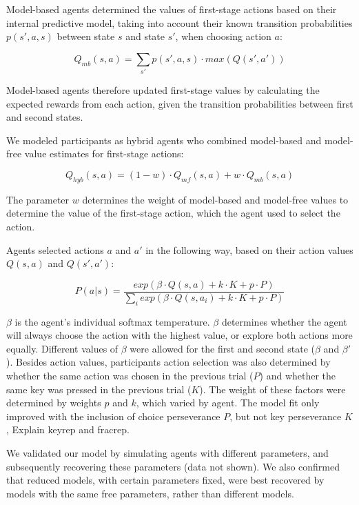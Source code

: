 \documentclass[11pt]{article} %
\begin{document}
Model-based agents determined the values of first-stage actions based on their internal predictive model, taking into account their known transition probabilities $p(s', a, s)$ between state $s$ and state $s'$, when choosing action $a$:

\begin{equation}
Q_{mb}(s, a) = \sum_{s'} p(s', a, s) \cdot max(Q(s', a'))
\end{equation}

Model-based agents therefore updated first-stage values by calculating the expected rewards from each action, given the transition probabilities between first and second states.

We modeled participants as hybrid agents who combined model-based and model-free value estimates for first-stage actions:

\begin{equation}
Q_{hyb}(s, a) = (1 - w) \cdot Q_{mf}(s, a) + w \cdot Q_{mb}(s, a)
\end{equation}

The parameter $w$ determines the weight of model-based and model-free values to determine the value of the first-stage action, which the agent used to select the action.

Agents selected actions $a$ and $a'$ in the following way, based on their action values $Q(s, a)$ and $Q(s', a')$:

\begin{equation}
P(a|s) = \frac{exp(\beta \cdot Q(s, a) + k \cdot K + p \cdot P)}{\sum_{i} exp(\beta \cdot Q(s, a_{i}) + k \cdot K + p \cdot P)}
\end{equation}

$\beta$ is the agent's individual softmax temperature. $\beta$ determines whether the agent will always choose the action with the highest value, or explore both actions more equally. Different values of $\beta$ were allowed for the first and second state ($\beta$ and $\beta'$). Besides action values, participants action selection was also determined by whether the same action was chosen in the previous trial ($P$) and whether the same key was pressed in the previous trial ($K$). The weight of these factors were determined by weights $p$ and $k$, which varied by agent. The model fit only improved with the inclusion of choice perseverance $P$, but not key perseverance $K$, 
Explain keyrep and fracrep.

We validated our model by simulating agents with different parameters, and subsequently recovering these parameters (data not shown). We also confirmed that reduced models, with certain parameters fixed, were best recovered by models with the same free parameters, rather than different models. 
\end{document}
